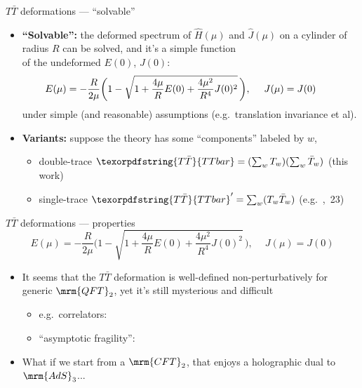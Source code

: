 \documentclass[
	10pt
	,handout
	,noamsthm
]{beamer}
\newcommand{\TTbar}{\texorpdfstring{\ensuremath{T\bar{T}}}{TTbar}\xspace}
\begin{document}
\begin{frame}{\TTbar deformations --- ``solvable''}{%
	\citeTTbar
}
\begin{itemize}

\item \textbf{``Solvable'':} the deformed spectrum of $\hat{H}(\mu)$ and $\hat{J}(\mu)$ on a cylinder of radius $R$ can be solved, 
and it's a simple function\\
 of the undeformed $E(0)$, $J(0)$:
\begin{equation}
\hspace{-2em}
	E(\mu) = - \frac{R }{ 2\mu } \bigg(1-\sqrt{1 + \frac{4\mu}{R} E(0) + \frac{4\mu^2}{R^4} J(0)^2 }
	\,\bigg), \ \quad J(\mu)=J(0) %
\end{equation}
under simple (and reasonable) assumptions (e.g.~translation invariance et al). 

\item \textbf{Variants:} suppose the theory has some ``components'' labeled by $w$,

\begin{itemize}
\item double-trace $\TTbar = (\sum_w T_w) (\sum_w \bar{T}_w)$ (this work)
\item single-trace $\TTbar' = \sum_w (T_w \bar{T}_w)$ (e.g.~\textit{\citeauthor{Cui:2023jrb}},~23)
\end{itemize}

\end{itemize}

\vspace{.5\baselineskip}
\end{frame}

\begin{frame}{\TTbar deformations --- properties}{%
	\textcite{Zamolodchikov:2004ce}\\
}
\vspace{-1.\baselineskip}
\begin{equation}
	E(\mu) = - \frac{R }{ 2\mu } \bigg(1-\sqrt{1 + \frac{4\mu}{R} E(0) + \frac{4\mu^2}{R^4} J(0)^2 }
	\,\bigg), \ \quad J(\mu)=J(0)  \label{ttbarspectrum}
\end{equation}
\vspace{-\baselineskip}
\begin{itemize}
\item It seems that the \TTbar deformation is well-defined non-perturbatively for generic $\mrm{QFT}_2$,
yet it's still mysterious and difficult\\
\begin{itemize}
\item e.g.~correlators: \textcite{Kraus:2018xrn,Cardy:2019qao,Cui:2023jrb}
\item ``asymptotic fragility'': \textcite{Dubovsky:2017cnj}
\end{itemize}

\pause
\item What if we start from a $\mrm{CFT}_2$, that enjoys a holographic dual to $\mrm{AdS}_3$...

\end{itemize}
\end{frame}
\end{document}
